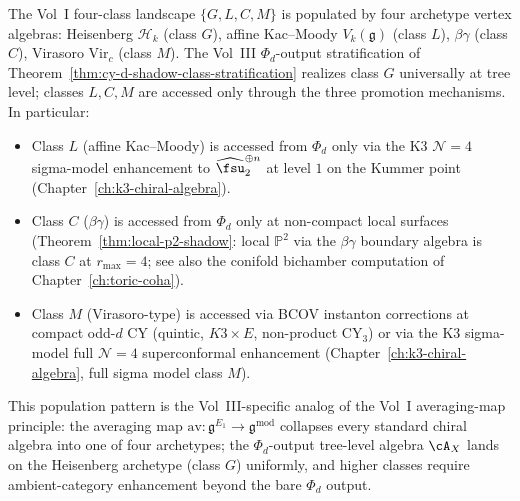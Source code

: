 \begin{remark}
\label{rem:cy-d-shadow-class-cross-vol-implication}
The Vol~I four-class landscape $\{G, L, C, M\}$ is populated by four
archetype vertex algebras: Heisenberg $\mathcal{H}_k$ (class $G$),
affine Kac--Moody $V_k(\mathfrak{g})$ (class $L$), $\beta\gamma$ (class
$C$), Virasoro $\mathrm{Vir}_c$ (class $M$). The Vol~III
$\Phi_d$-output stratification of
Theorem~\ref{thm:cy-d-shadow-class-stratification} realizes class $G$
universally at tree level; classes $L, C, M$ are accessed only through
the three promotion mechanisms. In particular:
\begin{itemize}
 \item Class $L$ (affine Kac--Moody) is accessed from $\Phi_d$ only via
 the K3 $\mathcal{N} = 4$ sigma-model enhancement to
 $\widehat{\fsu}_2^{\oplus n}$ at level $1$ on the Kummer point
 (Chapter~\ref{ch:k3-chiral-algebra}).
 \item Class $C$ ($\beta\gamma$) is accessed from $\Phi_d$ only at
 non-compact local surfaces (Theorem~\ref{thm:local-p2-shadow}:
 local $\mathbb{P}^2$ via the $\beta\gamma$ boundary algebra is
 class $C$ at $r_{\max} = 4$; see also the conifold bichamber
 computation of Chapter~\ref{ch:toric-coha}).
 \item Class $M$ (Virasoro-type) is accessed via BCOV instanton
 corrections at compact odd-$d$ CY (quintic, $K3 \times E$,
 non-product CY$_3$) or via the K3 sigma-model full
 $\mathcal{N} = 4$ superconformal enhancement (Chapter~\ref{ch:k3-chiral-algebra},
 full sigma model class $M$).
\end{itemize}
This population pattern is the Vol~III-specific analog of the Vol~I
averaging-map principle: the averaging map
$\mathrm{av}: \mathfrak{g}^{E_1} \to \mathfrak{g}^{\mathrm{mod}}$
collapses every standard chiral algebra into one of four archetypes;
the $\Phi_d$-output tree-level algebra $\cA_X$ lands on the Heisenberg
archetype (class $G$) uniformly, and higher classes require ambient-category
enhancement beyond the bare $\Phi_d$ output.
\end{remark}

